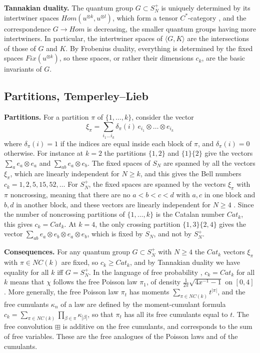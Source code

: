 \documentclass[11pt]{amsart}
\begin{document}
\medskip

\noindent\textbf{Tannakian duality.} The quantum group $G\subset S_N^+$ is uniquely determined by its intertwiner spaces $Hom(u^{\otimes k},u^{\otimes l})$, which form a tensor $C^*$-category \cite{wo2}, and the correspondence $G\to Hom$ is decreasing, the smaller quantum groups having more intertwiners. In particular, the intertwiner spaces of $\langle G,K\rangle$ are the intersections of those of $G$ and $K$. By Frobenius duality, everything is determined by the fixed spaces $Fix(u^{\otimes k})$, so these spaces, or rather their dimensions $c_k$, are the basic invariants of $G$.

\subsection{Partitions, Temperley--Lieb}\label{sec:tl}

\noindent\textbf{Partitions.} For a partition $\pi$ of $\{1,\ldots,k\}$, consider the vector
$$\xi_\pi=\sum_{i_1\ldots i_k}\delta_\pi(i)\,e_{i_1}\otimes\ldots\otimes e_{i_k}$$
where $\delta_\pi(i)=1$ if the indices are equal inside each block of $\pi$, and $\delta_\pi(i)=0$ otherwise. For instance at $k=2$ the partitions $\{1,2\}$ and $\{1\}\{2\}$ give the vectors $\sum_ae_a\otimes e_a$ and $\sum_{ab}e_a\otimes e_b$. The fixed spaces of $S_N$ are spanned by all the vectors $\xi_\pi$, which are linearly independent for $N\geq k$, and this gives the Bell numbers $c_k=1,2,5,15,52,\ldots$ For $S_N^+$, the fixed spaces are spanned by the vectors $\xi_\pi$ with $\pi$ noncrossing, meaning that there are no $a<b<c<d$ with $a,c$ in one block and $b,d$ in another block, and these vectors are linearly independent for $N\geq4$ \cite{ba1x,bsp}. Since the number of noncrossing partitions of $\{1,\ldots,k\}$ is the Catalan number $Cat_k$, this gives $c_k=Cat_k$. At $k=4$, the only crossing partition $\{1,3\}\{2,4\}$ gives the vector $\sum_{ab}e_a\otimes e_b\otimes e_a\otimes e_b$, which is fixed by $S_N$, and not by $S_N^+$.

\medskip

\noindent\textbf{Consequences.} For any quantum group $G\subset S_N^+$ with $N\geq4$ the $Cat_k$ vectors $\xi_\pi$ with $\pi\in NC(k)$ are fixed, so $c_k\geq Cat_k$, and by Tannakian duality we have equality for all $k$ iff $G=S_N^+$. In the language of free probability \cite{nsp}, $c_k=Cat_k$ for all $k$ means that $\chi$ follows the free Poisson law $\pi_1$, of density $\frac{1}{2\pi}\sqrt{4x^{-1}-1}$ on $[0,4]$. More generally, the free Poisson law $\pi_t$ has moments $\sum_{\pi\in NC(k)}t^{|\pi|}$, and the free cumulants $\kappa_n$ of a law are defined by the moment-cumulant formula $c_k=\sum_{\pi\in NC(k)}\prod_{\beta\in\pi}\kappa_{|\beta|}$, so that $\pi_t$ has all its free cumulants equal to $t$. The free convolution $\boxplus$ is additive on the free cumulants, and corresponds to the sum of free variables. These are the free analogues of the Poisson laws and of the cumulants.
\end{document}
